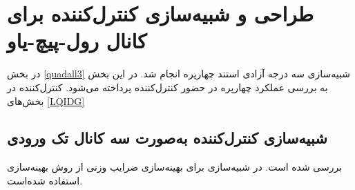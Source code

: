 \section{طراحی و شبیه‌سازی کنترل‌کننده برای کانال رول-پیچ-یاو}\label{roll_pitch_yaw_lqidg_section}
در بخش
\ref{quadall3}
شبیه‌سازی سه درجه آزادی استند چهارپره انجام شد. در این بخش به بررسی عملکرد چهارپره در حضور کنترل‌کننده  پرداخته می‌شود. کنترل‌کننده  در بخش‌های
\ref{LQIDG}
\subsection{شبیه‌سازی کنترل‌کننده به‌صورت سه کانال تک ورودی}
بررسی شده است.
 در شبیه‌سازی برای بهینه‌سازی ضرایب وزنی  از روش بهینه‌سازی
 \cite{Karimi2010}
استفاده شده‌است.

%
